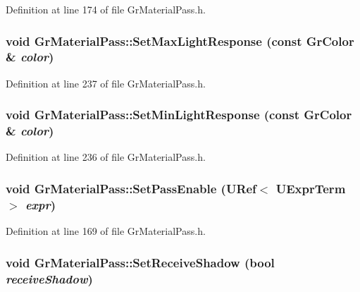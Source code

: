 Definition at line 174 of file GrMaterialPass.h.\hypertarget{class_gr_material_pass_f66502995683becd9fd606d48da3a384}{
\subsubsection[{SetMaxLightResponse}]{\setlength{\rightskip}{0pt plus 5cm}void GrMaterialPass::SetMaxLightResponse (const {\bf GrColor} \& {\em color})}}
\label{class_gr_material_pass_f66502995683becd9fd606d48da3a384}




Definition at line 237 of file GrMaterialPass.h.\hypertarget{class_gr_material_pass_ddf56d1ef2931a1cded781325ddd8738}{
\subsubsection[{SetMinLightResponse}]{\setlength{\rightskip}{0pt plus 5cm}void GrMaterialPass::SetMinLightResponse (const {\bf GrColor} \& {\em color})}}
\label{class_gr_material_pass_ddf56d1ef2931a1cded781325ddd8738}




Definition at line 236 of file GrMaterialPass.h.\hypertarget{class_gr_material_pass_ed26f0584038d1f297755fbfebd6e078}{
\subsubsection[{SetPassEnable}]{\setlength{\rightskip}{0pt plus 5cm}void GrMaterialPass::SetPassEnable ({\bf URef}$<$ {\bf UExprTerm} $>$ {\em expr})}}
\label{class_gr_material_pass_ed26f0584038d1f297755fbfebd6e078}




Definition at line 169 of file GrMaterialPass.h.\hypertarget{class_gr_material_pass_c4c6bb30dab587d51b255c91f428edaa}{
\subsubsection[{SetReceiveShadow}]{\setlength{\rightskip}{0pt plus 5cm}void GrMaterialPass::SetReceiveShadow (bool {\em receiveShadow})}}
\label{class_gr_material_pass_c4c6bb30dab587d51b255c91f428edaa}





